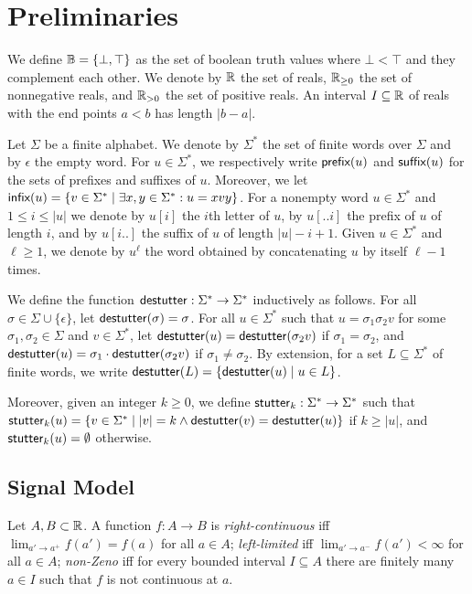 \section{Preliminaries}

We define $\mathbb{B} = \{ \bot, \top \}$ as the set of boolean truth values where $\bot < \top$ and they complement each other.
We denote by $\mathbb{R}$ the set of reals, $\mathbb{R}_{\geq 0}$ the set of nonnegative reals, and $\mathbb{R}_{> 0}$ the set of positive reals.
An interval $I \subseteq \mathbb{R}$ of reals with the end points $a < b$ has length $|b-a|$.

Let $\Sigma$ be a finite alphabet.
We denote by $\Sigma^*$ the set of finite words over $\Sigma$ and by $\epsilon$ the empty word.
For $u \in \Sigma^*$, we respectively write $\textsf{prefix}(u)$ and $\textsf{suffix}(u)$ for the sets of prefixes and suffixes of $u$.
Moreover, we let $\infx(u) = \{v \in \Sigma^* \st \exists x,y \in \Sigma^* : u = xvy\}$.
For a nonempty word $u \in \Sigma^*$ and $1 \leq i \leq |u|$ we denote by $u[i]$ the $i$th letter of $u$, by $u[..i]$ the prefix of $u$ of length $i$, and by $u[i..]$ the suffix of $u$ of length $|u| - i + 1$. 
Given $u \in \Sigma^*$ and $\ell \geq 1$, we denote by $u^\ell$ the word obtained by concatenating $u$ by itself $\ell - 1$ times.

We define the function $\mathsf{destutter} : \Sigma^* \to \Sigma^*$ inductively as follows.
For all $\sigma \in \Sigma \cup \{\epsilon\}$, let $\mathsf{destutter}(\sigma) = \sigma$.
For all $u \in \Sigma^*$ such that $u = \sigma_1 \sigma_2 v$ for some $\sigma_1,\sigma_2 \in \Sigma$ and $v \in \Sigma^*$, let $\mathsf{destutter}(u) = \mathsf{destutter}(\sigma_2 v)$ if $\sigma_1 = \sigma_2$, and  $\mathsf{destutter}(u) = \sigma_1 \cdot \mathsf{destutter}(\sigma_2 v)$ if $\sigma_1 \neq \sigma_2$.
By extension, for a set $L \subseteq \Sigma^*$ of finite words, we write $\destutter(L) = \{\destutter(u) \st u \in L\}$.

Moreover, given an integer $k \geq 0$, we define $\mathsf{stutter}_k : \Sigma^* \to \Sigma^*$ such that $\stutter_k(u) = \{v \in \Sigma^* \st |v| = k \land \destutter(v) = \destutter(u)\}$ if $k \geq |u|$, and $\mathsf{stutter}_k(u) = \emptyset$ otherwise.

\subsection{Signal Model}

Let $A,B \subset \mathbb{R}$.
A function $f : A \to B$ is
\emph{right-continuous} iff $\lim_{a' \to a^+} f(a') = f(a)$ for all $a \in A$;
\emph{left-limited} iff $\lim_{a' \to a^-} f(a') < \infty$ for all $a \in A$;
\emph{non-Zeno} iff for every bounded interval $I \subseteq A$ there are finitely many $a \in I$ such that $f$ is not continuous at $a$.

